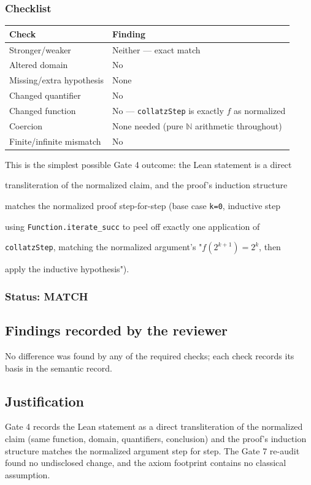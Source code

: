 \documentclass[11pt]{article}
\begin{document}
\subsubsection*{Checklist}
\begin{center}\small\begin{tabular}{p{}p{}}\toprule
Check & Finding \\ \midrule
Stronger/weaker & Neither --- exact match \\
Altered domain & No \\
Missing/extra hypothesis & None \\
Changed quantifier & No \\
Changed function & No --- \texttt{collatzStep} is exactly $f$ as normalized \\
Coercion & None needed (pure \ensuremath{\mathbb{N}} arithmetic throughout) \\
Finite/infinite mismatch & No \\
\bottomrule\end{tabular}\end{center}
This is the simplest possible Gate 4 outcome: the Lean statement is a direct

transliteration of the normalized claim, and the proof's induction structure

matches the normalized proof step-for-step (base case \texttt{k=0}, inductive step

using \texttt{Function.iterate\_succ} to peel off exactly one application of

\texttt{collatzStep}, matching the normalized argument's "$f(2^{k+1})=2^k$, then

apply the inductive hypothesis").

\subsubsection*{Status: MATCH}

\subsection*{Findings recorded by the reviewer}
No difference was found by any of the required checks; each check records its basis in the semantic record.
\subsection*{Justification}
Gate 4 records the Lean statement as a direct transliteration of the normalized claim (same function, domain, quantifiers, conclusion) and the proof's induction structure matches the normalized argument step for step. The Gate 7 re-audit found no undisclosed change, and the axiom footprint contains no classical assumption.
\end{document}
